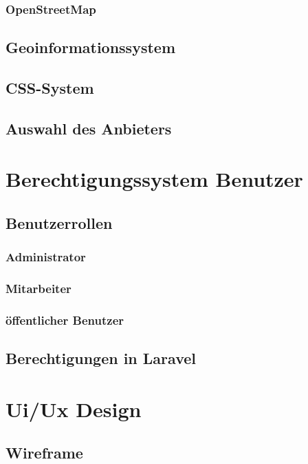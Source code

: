 \subsubsection{OpenStreetMap}

\subsection{Geoinformationssystem }

\subsection{CSS-System}

\subsection{Auswahl des Anbieters}


\section{Berechtigungssystem Benutzer}

\subsection{Benutzerrollen}

\subsubsection{Administrator}
\subsubsection{Mitarbeiter}
\subsubsection{öffentlicher Benutzer}

\subsection{Berechtigungen in Laravel}


\section{Ui/Ux Design}

\subsection{Wireframe}


